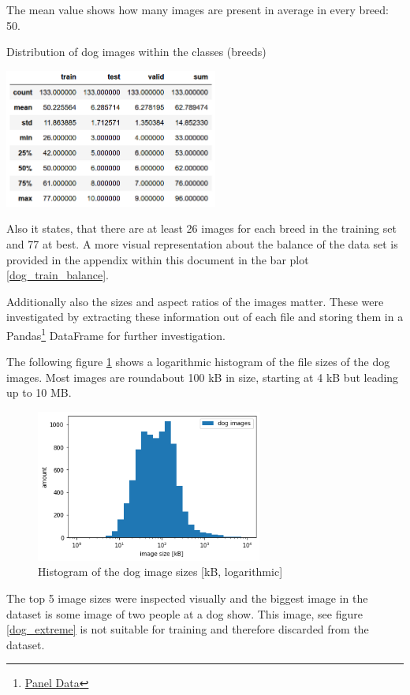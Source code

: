 \documentclass[paper=A4, DIV=10, parskip=half]{scrartcl}
\begin{document}
The mean value shows how many images are present in average in every breed: 50.

\begin{table}
  \centering
  \caption{Distribution of dog images within the classes (breeds)}
  \includegraphics[width=7cm]{images/dog_deviation.png}
  \label{table_dogs}
\end{table}

Also it states, that there are at least 26 images for each
breed in the training set and 77 at best. A more visual representation about the
balance of the data set is provided in the appendix within this document in the
bar plot \ref{dog_train_balance}.

Additionally also the sizes and aspect ratios of the images matter. These were
investigated by extracting these information out of each file and storing them
in a Pandas\footnote{\href{pandas.pydata.org/}{Panel Data}} DataFrame for
further investigation. 

The following figure \ref{dog_image_sizes} shows a logarithmic histogram of the
file sizes of the dog images. Most images are roundabout 100 kB in size,
starting at 4 kB but leading up to 10 MB.

\begin{figure}[H]
  \centering
  \includegraphics[height=5cm]{images/dog_image_sizes.png}
  \caption{Histogram of the dog image sizes [kB, logarithmic]}
  \label{dog_image_sizes}
\end{figure}

The top 5 image sizes were inspected visually and the biggest image in the
dataset is some image of two people at a dog show. This image, see figure
\ref{dog_extreme} is not suitable for training and therefore discarded from the
dataset.
\end{document}
